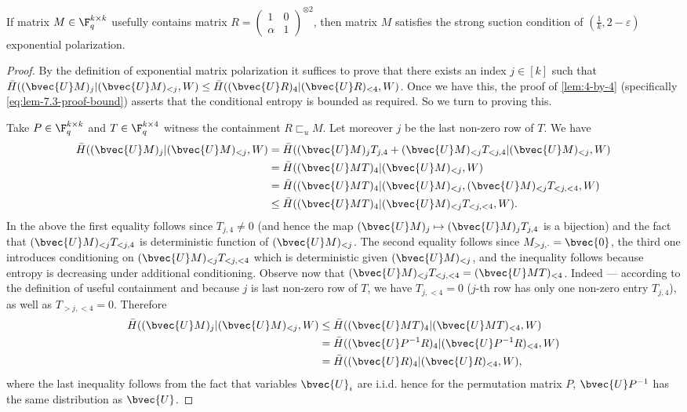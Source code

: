 \documentclass[11pt]{article}
\renewcommand{\H}{\bar{H}}
\newcommand{\usef}{\sqsubset_u}
\newcommand{\HadMat}{\left(\begin{smallmatrix} 1 & 0 \\ \alpha & 1 \end{smallmatrix}\right)}
\begin{document}
\begin{lemma}
	\label{lem:useful-usefulness}
	If matrix $M\in\F_q^{k \times k}$ usefully contains matrix $R = \HadMat^{\otimes 2}$, then matrix $M$ satisfies the strong suction condition of $(\frac{1}{k}, 2 - \varepsilon)$ exponential polarization.
\end{lemma}
\begin{proof}
	By the definition of exponential matrix polarization it suffices to prove that there exists an index $j \in [k]$ such that $\H( (\bvec{U}M)_{j} | (\bvec{U}M)_{<j}, W) \leq \H( (\bvec{U}R)_4 | (\bvec{U}R)_{< 4}, W)$. Once we have this, the proof of \cref{lem:4-by-4} (specifically \cref{eq:lem-7.3-proof-bound}) asserts that the conditional entropy is bounded as required.
	So we turn to proving this.
	
	Take $P \in \F_q^{k\times k}$ and  $T \in \F_q^{k\times 4}$ witness the containment $R \usef M$. Let moreover $j$ be the last non-zero row of $T$. We have 
	\begin{align*}
		\H( (\bvec{U}M)_{j} | (\bvec{U}M)_{<j}, W) & = \H( (\bvec{U}M)_{j} T_{j, 4} + (\bvec{U}M)_{<j} T_{<j, 4} | (\bvec{U}M)_{<j}, W) \\
		& = \H( (\bvec{U}MT)_4 | (\bvec{U}M)_{<j}, W) \\
		& = \H( (\bvec{U}MT)_4 | (\bvec{U}M)_{<j}, (\bvec{U}M)_{<j} T_{<j, <4}, W)\\
		& \leq \H( (\bvec{U}MT)_4 | (\bvec{U}M)_{<j} T_{<j, <4}, W).
	\end{align*}
	In the above the first equality follows since $T_{j, 4}\ne 0$ (and hence the map $(\bvec{U}M)_{j} \mapsto (\bvec{U}M)_{j} T_{j, 4}$ is a bijection) and the fact that $(\bvec{U}M)_{<j} T_{<j, 4}$ is deterministic function of $(\bvec{U}M)_{<j}$. The second equality follows since $M_{>j,\cdot}=\bvec{0}$, the third one introduces conditioning on $(\bvec{U}M)_{<j} T_{<j, <4}$ which is deterministic given $(\bvec{U}M)_{<j}$, and the inequality follows because entropy is decreasing under additional conditioning. 
	Observe now that $(\bvec{U}M)_{<j} T_{<j, <4} = (\bvec{U}MT)_{<4}$. Indeed --- according to the definition of useful containment and because $j$ is last non-zero row of $T$, we have $T_{j, <4} = 0$ ($j$-th row has only one non-zero entry $T_{j, 4}$), as well as $T_{>j, <4} = 0$. Therefore
	\begin{align*}
		\H( (\bvec{U}M)_{j} | (\bvec{U}M)_{<j}, W) & \leq \H( (\bvec{U}MT)_4 | (\bvec{U}MT)_{<4}, W) \\
		& = \H( (\bvec{U} P^{-1} R)_4 | (\bvec{U}P^{-1} R)_{<4}, W) \\
		& = \H( (\bvec{U}R)_4 | (\bvec{U}R)_{< 4}, W),
	\end{align*}
	where the last inequality follows from the fact that variables $\bvec{U}_i$ are i.i.d. hence for the permutation matrix $P$, $\bvec{U} P^{-1}$ has the same distribution as $\bvec{U}$. 
\end{proof}
\end{document}
